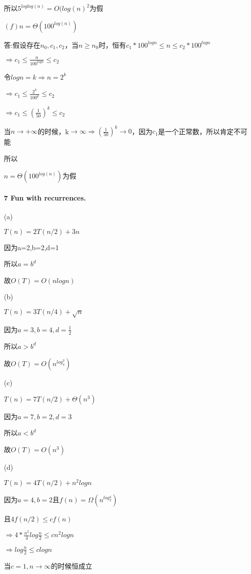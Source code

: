 \documentclass[
]{ctexart}
\begin{document}
所以\(5^{loglog(n)}=O(log(n)^2\)为假

\((f)n=\Theta(100^{log(n)})\)

答:假设存在\(n_0,c_1,c_2\)，当\(n\geq n_0\)时，恒有\(c_1*100^{logn}\leq n\leq c_2*100^{logn}\)

\(\Rightarrow c_1\leq\frac{n}{100^{logn}}\leq c_2\)

令\(logn=k\Rightarrow n=2^k\)

\(\Rightarrow c_1\leq \frac{2^k}{100^k}\leq c_2\)

\(\Rightarrow c_1\leq(\frac{1}{50})^k\leq c_2\)

当\(n\rightarrow+∞\)的时候，k\(\rightarrow∞ \Rightarrow (\frac{1}{50})^k\rightarrow0\)，因为\(c_1\)是一个正常数，所以肯定不可能

所以

\(n=\Theta(100^{log(n)})\)为假

\hypertarget{header-n147}{%
\paragraph{\texorpdfstring{7 \textbf{Fun with
recurrences.}}{7 Fun with recurrences.}}\label{header-n147}}

(a)

\(T(n)=2T(n/2)+3n\)

因为a=2,b=2,d=1

所以\(a=b^d\)

故\(O(T)=O(nlogn)\)

(b)

\(T(n)=3T(n/4)+\sqrt{n}\)

因为\(a=3,b=4,d=\frac{1}{2}\)

所以\(a>b^d\)

故\(O(T)=O(n^{log_4^3})\)

(c)

\(T(n)=7T(n/2)+\Theta(n^3)\)

因为\(a=7,b=2,d=3\)

所以\(a<b^d\)

故\(O(T)=O(n^3)\)

(d)

\(T(n)=4T(n/2)+n^2logn\)

因为\(a=4,b=2\)且\(f(n)=\Omega(n^{log_2^4})\)

且\(4f(n/2)\leq cf(n)\)

\(\Rightarrow4*\frac{n^2}{4}log\frac{n}{2}\leq cn^2logn\)

\(\Rightarrow log\frac{n}{2}\leq clogn\)

当\(c=1,n\rightarrow ∞\)的时候恒成立
\end{document}
